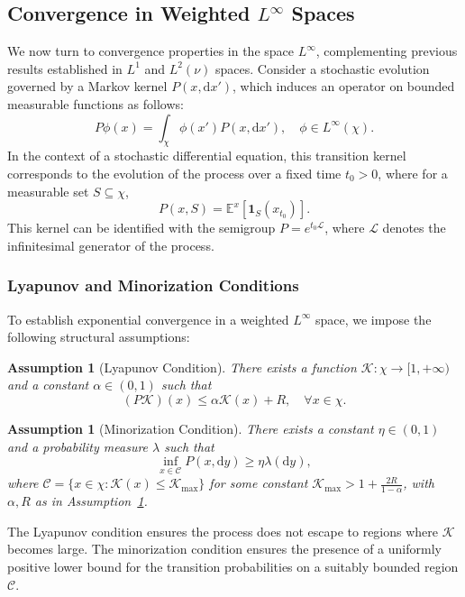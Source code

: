\documentclass[11pt, twoside]{report}
\newtheorem{assumption}[theorem]{Assumption}
\begin{document}
\subsection{Convergence in Weighted \texorpdfstring{$L^\infty$}{L-infinity} Spaces} \label{sec: linfty}

We now turn to convergence properties in the space $L^\infty$, complementing previous results established in $L^1$ and $L^2(\nu)$ spaces. Consider a stochastic evolution governed by a Markov kernel $P(x, \mathrm{d}x')$, which induces an operator on bounded measurable functions as follows:
\[
P\phi(x) = \int_\chi \phi(x')P(x, \mathrm{d}x'), \quad \phi \in L^\infty(\chi).
\]
In the context of a stochastic differential equation, this transition kernel corresponds to the evolution of the process over a fixed time $t_0 > 0$, where for a measurable set $S \subseteq \chi$,
\[
P(x, S) = \mathbb{E}^x\left[\mathbf{1}_S\left(x_{t_0}\right)\right].
\]
This kernel can be identified with the semigroup $P = e^{t_0 \mathcal{L}}$, where $\mathcal{L}$ denotes the infinitesimal generator of the process.

\subsubsection{Lyapunov and Minorization Conditions}

To establish exponential convergence in a weighted $L^\infty$ space, we impose the following structural assumptions:

\begin{assumption}[Lyapunov Condition] \label{ass:lyapunov}
There exists a function $\mathcal{K} : \chi \to [1, +\infty)$ and a constant $\alpha \in (0,1)$ such that
\[
(P\mathcal{K})(x) \leq \alpha \mathcal{K}(x) + R, \quad \forall x \in \chi.
\]
\end{assumption}

\begin{assumption}[Minorization Condition] \label{ass:minorization}
There exists a constant $\eta \in (0,1)$ and a probability measure $\lambda$ such that
\[
\inf_{x \in \mathcal{C}} P(x, \mathrm{d}y) \geq \eta \lambda(\mathrm{d}y),
\]
where $\mathcal{C} = \{x \in \chi : \mathcal{K}(x) \leq \mathcal{K}_{\max}\}$ for some constant $\mathcal{K}_{\max} > 1 + \frac{2R}{1 - \alpha}$, with $\alpha, R$ as in Assumption~\ref{ass:lyapunov}.
\end{assumption}

The Lyapunov condition ensures the process does not escape to regions where $\mathcal{K}$ becomes large. The minorization condition ensures the presence of a uniformly positive lower bound for the transition probabilities on a suitably bounded region $\mathcal{C}$.
\end{document}
